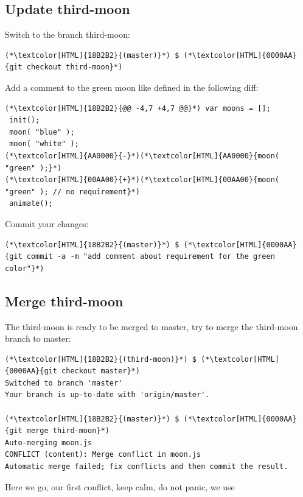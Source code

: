 \subsection{Update third-moon}
\begin{frame}[fragile]
  \subslidetitle

  Switch to the branch third-moon:
  \begin{lstlisting}
(*\textcolor[HTML]{18B2B2}{(master)}*) $ (*\textcolor[HTML]{0000AA}{git checkout third-moon}*)
\end{lstlisting}

  Add a comment to the green moon like defined in the following diff:
  \begin{lstlisting}
(*\textcolor[HTML]{18B2B2}{@@ -4,7 +4,7 @@}*) var moons = [];
 init();
 moon( "blue" );
 moon( "white" );
(*\textcolor[HTML]{AA0000}{-}*)(*\textcolor[HTML]{AA0000}{moon( "green" );}*)
(*\textcolor[HTML]{00AA00}{+}*)(*\textcolor[HTML]{00AA00}{moon( "green" ); // no requirement}*)
 animate();
\end{lstlisting}

  Commit your changes:
  \begin{lstlisting}
(*\textcolor[HTML]{18B2B2}{(master)}*) $ (*\textcolor[HTML]{0000AA}{git commit -a -m "add comment about requirement for the green color"}*)
\end{lstlisting}
\end{frame}

\subsection{Merge third-moon}
\begin{frame}[fragile]
  \subslidetitle

  The third-moon is ready to be merged to master, try to merge the third-moon branch to master:
  \begin{lstlisting}
(*\textcolor[HTML]{18B2B2}{(third-moon)}*) $ (*\textcolor[HTML]{0000AA}{git checkout master}*)
Switched to branch 'master'
Your branch is up-to-date with 'origin/master'.

(*\textcolor[HTML]{18B2B2}{(master)}*) $ (*\textcolor[HTML]{0000AA}{git merge third-moon}*)
Auto-merging moon.js
CONFLICT (content): Merge conflict in moon.js
Automatic merge failed; fix conflicts and then commit the result.
\end{lstlisting}

  Here we go, our first conflict, keep calm, do not panic, we use 
\end{frame}

